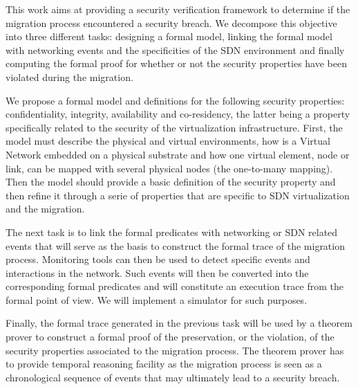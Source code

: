 This work aims at providing a security verification framework to determine if the migration process encountered a security breach.
We decompose this objective into three different tasks: designing a formal model, linking the formal model with networking events and the specificities of the SDN environment and finally computing the formal proof for whether or not the security properties have been violated during the migration.
 
We propose a formal model and definitions for the following security properties: confidentiality, integrity, availability 
and co-residency, the latter being a property specifically related to the security of the virtualization infrastructure. First, the model must describe the physical and virtual environments, how is a Virtual Network embedded on a physical substrate and how one virtual element, node or link, can be mapped with several physical nodes (\ie the one-to-many mapping).
Then the model should provide a basic definition of the security property and then refine it through a serie of properties that are specific to SDN virtualization and the migration.

The next task is to link the formal predicates with networking or SDN related events that will serve as the basis to construct the formal trace of the migration process.
Monitoring tools can then be used to detect specific events and interactions in the network. Such events will then be converted into the corresponding formal predicates and will constitute an execution trace from the formal point of view.
We will implement a simulator for such purposes.

Finally, the formal trace generated in the previous task will be used by a theorem prover to construct a formal proof of the preservation, or the violation, of the security properties associated to the migration process. The theorem prover has to provide temporal reasoning facility as the migration process is seen as a chronological sequence of events that may ultimately lead to a security breach.




